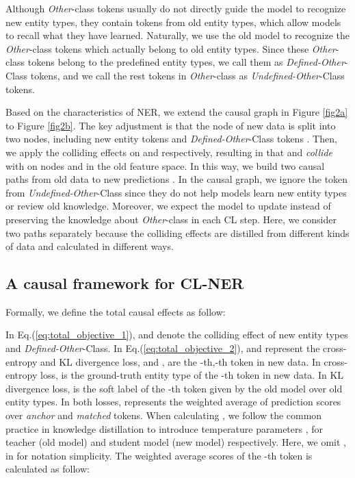 \documentclass[11pt]{article}
\begin{document}
Although \textit{Other}-class tokens usually do not directly guide the model to recognize new entity types, they contain tokens from old entity types, which allow models to recall what they have learned.
Naturally, we use the old model to recognize the \textit{Other}-class tokens which actually belong to old entity types.
Since these \textit{Other}-class tokens belong to the predefined entity types, we call them as \textit{Defined-Other}-Class tokens, and we call the rest tokens in \textit{Other}-class as \textit{Undefined-Other}-Class tokens.

Based on the characteristics of NER, we extend the causal graph in Figure \ref{fig2a} to Figure \ref{fig2b}.
The key adjustment is that the node of new data is split into two nodes, including new entity tokens  and \textit{Defined-Other}-Class tokens .
Then, we apply the colliding effects on  and  respectively, resulting in that  and  \textit{collide} with  on nodes  and  in the old feature space.
In this way, we build two causal paths from old data  to new predictions .
In the causal graph, we ignore the token from \textit{Undefined-Other}-Class since they do not help models learn new entity types or review old knowledge.
Moreover, we expect the model to update instead of preserving the knowledge about \textit{Other}-class in each CL step. 
Here, we consider two paths separately because the colliding effects are distilled from different kinds of data and calculated in different ways.

\subsection{A causal framework for CL-NER}
Formally, we define the total causal effects  as follow:

In Eq.(\ref{eq:total_objective_1}),  and  denote the colliding effect of new entity types and \textit{Defined-Other}-Class. 
In Eq.(\ref{eq:total_objective_2}),  and  represent the cross-entropy and KL divergence loss, and , are the -th,-th token in new data.
In cross-entropy loss,  is the ground-truth entity type of the -th token in new data.
In KL divergence loss,  is the soft label of the -th token given by the old model over old entity types.
In both losses,  represents the weighted average of prediction scores over \textit{anchor} and \textit{matched} tokens.
When calculating , we follow the common practice in knowledge distillation to introduce temperature parameters ,   for teacher (old model) and student model (new model) respectively.
Here, we omit ,  in  for notation simplicity.
The weighted average scores of the -th token is calculated as follow:
\end{document}
